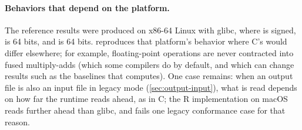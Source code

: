 \paragraph{Behaviors that depend on the platform.} The reference results were
produced on x86-64 Linux with glibc, where  is signed, 
is 64 bits, and  is 64 bits. \wfdbx{} reproduces that
platform's behavior where C's would differ elsewhere; for example,
floating-point operations are never contracted into fused multiply-adds
(which some compilers do by default, and which can change results such as
the baselines that  computes). One case remains: when an output
file is also an input file in legacy mode (\cref{sec:output-input}), what is
read depends on how far the runtime reads ahead, as in C; the R
implementation on macOS reads further ahead than glibc, and fails one legacy
conformance case for that reason.
